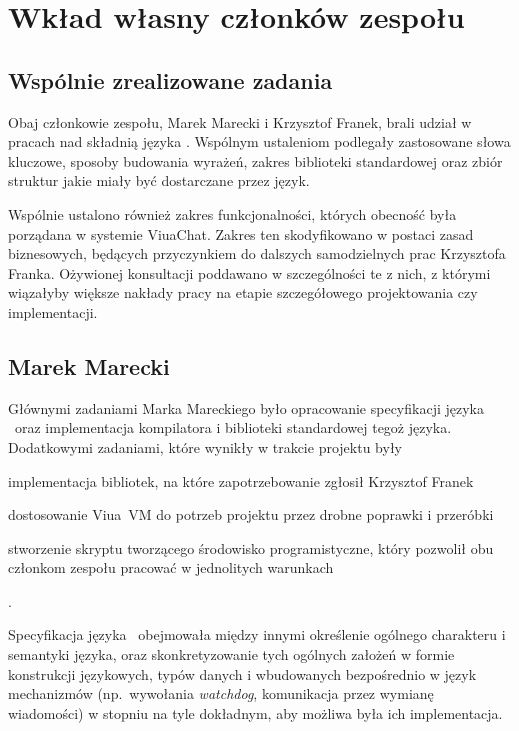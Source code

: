 \chapter{Wkład własny członków zespołu}
\label{wklad_wlasny}

\section{Wspólnie zrealizowane zadania}

Obaj członkowie zespołu, Marek Marecki i Krzysztof Franek, brali udział w pracach
nad składnią języka \ViuAct. Wspólnym ustaleniom podlegały zastosowane słowa
kluczowe, sposoby budowania wyrażeń, zakres biblioteki standardowej oraz
zbiór struktur jakie miały być dostarczane przez język.

Wspólnie ustalono również zakres funkcjonalności, których obecność była porządana
w systemie ViuaChat. Zakres ten skodyfikowano w postaci zasad biznesowych, będących
przyczynkiem do dalszych samodzielnych prac Krzysztofa Franka. Ożywionej
konsultacji poddawano w szczególności te z nich, z którymi wiązałyby
większe nakłady pracy na etapie szczegółowego projektowania czy implementacji.

\section{Marek Marecki}

Głównymi zadaniami Marka Mareckiego było opracowanie specyfikacji języka
\ViuAct\ oraz implementacja kompilatora i biblioteki standardowej tegoż języka.
Dodatkowymi zadaniami, które wynikły w trakcie projektu były
\begin{enumerate*}[label=(\arabic*)]
\item implementacja bibliotek, na które zapotrzebowanie zgłosił Krzysztof Franek
\item dostosowanie Viua~VM do potrzeb projektu przez drobne poprawki i przeróbki
\item stworzenie skryptu tworzącego środowisko programistyczne, który pozwolił
    obu członkom zespołu pracować w jednolitych warunkach
\end{enumerate*}.

Specyfikacja języka \ViuAct\ obejmowała między innymi określenie ogólnego
charakteru i semantyki języka, oraz skonkretyzowanie tych ogólnych założeń w
formie konstrukcji językowych, typów danych i wbudowanych bezpośrednio w język
mechanizmów (np.~wywołania \emph{watchdog}, komunikacja przez wymianę
wiadomości) w stopniu na tyle dokładnym, aby możliwa była ich implementacja.

